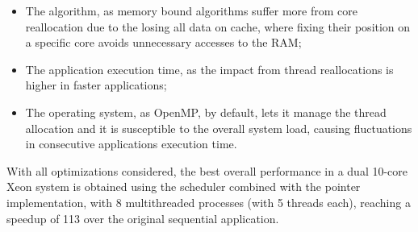 \begin{itemize}
	\item The algorithm, as memory bound algorithms suffer more from core reallocation due to the losing all data on cache, where fixing their position on a specific core avoids unnecessary accesses to the RAM;
	\item The application execution time, as the impact from thread reallocations is higher in faster applications;
	\item The operating system, as OpenMP, by default, lets it manage the thread allocation and it is susceptible to the overall system load, causing fluctuations in consecutive applications execution time.
\end{itemize}

With all optimizations considered, the best overall performance in a dual 10-core Xeon system is obtained using the scheduler combined with the pointer implementation, with 8 multithreaded processes (with 5 threads each), reaching a speedup of 113 over the original sequential application.
